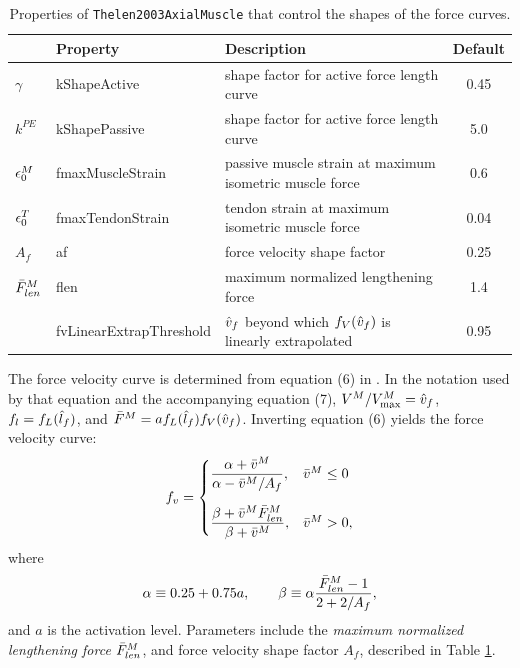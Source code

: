 \begin{table}[h]
\begin{center}
\begin{tabular}{|l|l|l|c|} 
\hline
& Property & Description & Default\\
\hline
$\gamma$ & {\sf kShapeActive} & 
shape factor for active force length curve & 0.45 \\
$k^{PE}$ & {\sf kShapePassive} & 
shape factor for active force length curve & 5.0 \\
$\epsilon_0^M$ & {\sf fmaxMuscleStrain} & 
passive muscle strain at maximum isometric muscle force & 0.6 \\
$\epsilon_0^T$ & {\sf fmaxTendonStrain} & 
tendon strain at maximum isometric muscle force & 0.04 \\
$A_f$ & {\sf af} & 
force velocity shape factor & 0.25 \\
$\bar{F}^M_{len}$ & {\sf flen} & 
maximum normalized lengthening force & 1.4 \\
& {\sf fvLinearExtrapThreshold} &
$\hat{v}_f$ beyond which $f_V(\hat{v}_f)$ is linearly extrapolated & 0.95\\
\hline
\end{tabular}
\end{center}
\caption{Properties of {\tt Thelen2003AxialMuscle} that control
the shapes of the force curves.}
\label{ThelenProps:tab}
\end{table}

The force velocity curve is determined from equation (6)
in \cite{thelen2003adjustment}. In the notation used by that equation
and the accompanying equation (7), $V^M/V^M_\text{max} = \hat{v}_f$, $f_l =
f_L(\hat{l}_f)$, and $\bar F^M = a f_L(\hat{l}_f) f_V(\hat{v}_f)$. Inverting equation
(6) yields the force velocity curve:
%
\begin{equation*}
f_v = 
\begin{cases}
\dfrac {\alpha + \bar{v}^M}{\alpha -\bar{v}^M/A_f}, & \bar{v}^M \le 0 \\[1.5em]
\dfrac {\beta + \bar{v}^M \bar{F}^M_{len}}{\beta + \bar{v}^M},
& \bar{v}^M > 0,
\end{cases}
\label{fv:eqn}
\end{equation*}
%
where
%
\begin{equation*}
\alpha \equiv 0.25 + 0.75 a, \qquad 
\beta \equiv \alpha \frac{\bar{F}^M_{len} - 1}{2 + 2/A_f},
\end{equation*}
%
and $a$ is the activation level. Parameters include the {\it maximum
normalized lengthening force} $\bar{F}^M_{len}$, and force velocity shape factor
$A_f$, described in Table \ref{ThelenProps:tab}.

